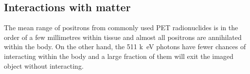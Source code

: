 \begin{table}[htbp]
  \caption{Commonly used radioisotopes and their relevant characteristics for PET imaging~\cite{Conti2016}.}
\label{tab:radioisotopes}%
\end{table}%

\subsection{Interactions with matter}
The mean range of positrons from commonly used PET radionuclides is in the order of a few millimetres within tissue and almost all positrons are annihilated within the body.
On the other hand, the 511 \si{k\electronvolt} photons have fewer chances of interacting within the body and a large fraction of them will exit the imaged object without interacting. 

